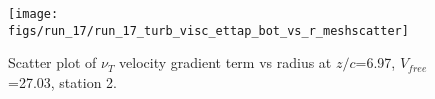 \begin{figure}[H]
\centering
\texttt{[image: figs/run\_17/run\_17\_turb\_visc\_ettap\_bot\_vs\_r\_meshscatter]}
\caption{Scatter plot of $\nu_T$ velocity gradient term vs radius at $z/c$=6.97, $V_{free}$=27.03, station 2.}
\label{fig:run_17_turb_visc_ettap_bot_vs_r_meshscatter}
\end{figure}


